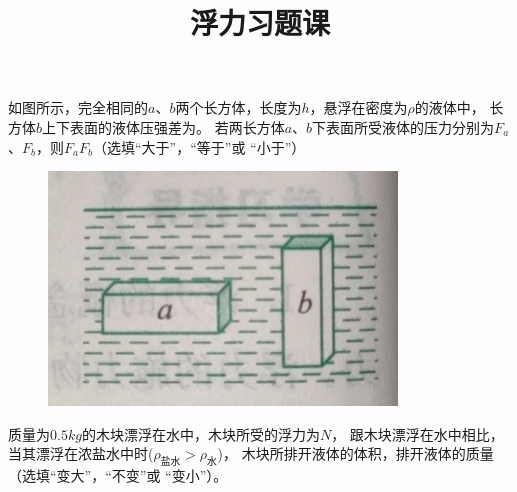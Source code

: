 \documentclass[a4paper,cs4size]{BHCexam}
\title{浮力习题课}
\begin{document}
\maketitle
\begin{groups}
    \group{}

    \begin{questions}[]

        \question[5] 如图所示，完全相同的$a$、$b$两个长方体，长度为$h$，悬浮在密度为$\rho$的液体中，
        长方体$b$上下表面的液体压强差为\underline{\quad\quad\quad\quad}。
        若两长方体$a$、$b$下表面所受液体的压力分别为$F_a$、$F_b$，则$F_a$\underline{\quad\quad}$F_b$（选填“大于”，“等于”或
        “小于”）
        \begin{figure}[htb]
            \flushright
            \includegraphics [scale=0.5,trim=0 0 0 0]{./image/pyhsics_buoyantforce_1.png}
            \label{fig:fig_buoyantforce_1.png}
        \end{figure}
        \vspace{0.5cm}

        \question[5] 质量为$0.5kg$的木块漂浮在水中，木块所受的浮力为\underline{\quad\quad\quad\quad}$N$，
        跟木块漂浮在水中相比，当其漂浮在浓盐水中时($\rho_{\text{盐水}}>\rho_{\text{水}}$)，
        木块所排开液体的体积\underline{\quad\quad\quad\quad}，排开液体的质量\underline{\quad\quad\quad\quad}
        （选填“变大”，“不变”或 “变小”）。
        \vspace{0.5cm}


\end{questions}
\end{groups}
\end{document}
